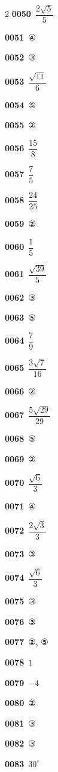 \documentclass[10pt,a4paper]{article}
\begin{document}
\begin{multicols}{2}
\noindent\textbf{0050}\ $\dfrac{2\sqrt{5}}{5}$\par
\noindent\textbf{0051}\ ④\par
\noindent\textbf{0052}\ ③\par
\noindent\textbf{0053}\ $\dfrac{\sqrt{11}}{6}$\par
\noindent\textbf{0054}\ ⑤\par
\noindent\textbf{0055}\ ②\par
\noindent\textbf{0056}\ $\dfrac{15}{8}$\par
\noindent\textbf{0057}\ $\dfrac{7}{5}$\par
\noindent\textbf{0058}\ $\dfrac{24}{25}$\par
\noindent\textbf{0059}\ ②\par
\noindent\textbf{0060}\ $\dfrac{1}{5}$\par
\noindent\textbf{0061}\ $\dfrac{\sqrt{39}}{5}$\par
\noindent\textbf{0062}\ ③\par
\noindent\textbf{0063}\ ⑤\par
\noindent\textbf{0064}\ $\dfrac{7}{9}$\par
\noindent\textbf{0065}\ $\dfrac{3\sqrt{7}}{16}$\par
\noindent\textbf{0066}\ ②\par
\noindent\textbf{0067}\ $\dfrac{5\sqrt{29}}{29}$\par
\noindent\textbf{0068}\ ⑤\par
\noindent\textbf{0069}\ ②\par
\noindent\textbf{0070}\ $\dfrac{\sqrt{6}}{3}$\par
\noindent\textbf{0071}\ ④\par
\noindent\textbf{0072}\ $\dfrac{2\sqrt{3}}{3}$\par
\noindent\textbf{0073}\ ③\par
\noindent\textbf{0074}\ $\dfrac{\sqrt{6}}{3}$\par
\noindent\textbf{0075}\ ③\par
\noindent\textbf{0076}\ ③\par
\noindent\textbf{0077}\ ②, ⑤\par
\noindent\textbf{0078}\ $1$\par
\noindent\textbf{0079}\ $-4$\par
\noindent\textbf{0080}\ ②\par
\noindent\textbf{0081}\ ③\par
\noindent\textbf{0082}\ ③\par
\noindent\textbf{0083}\ $30^\circ$\par

\end{multicols}
\end{document}
